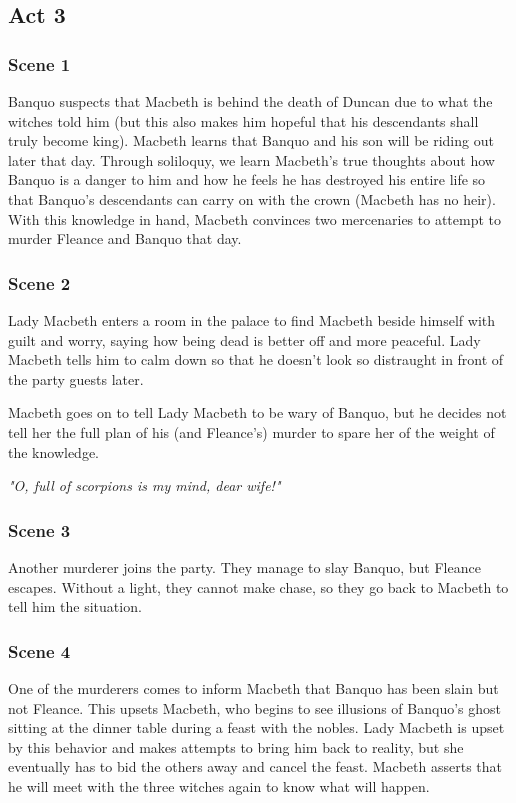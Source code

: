\subsection{Act 3}

\subsubsection{Scene 1}

Banquo suspects that Macbeth is behind the death of Duncan due to what the
witches told him (but this also makes him hopeful that his descendants shall
truly become king). Macbeth learns that Banquo and his son will be riding out
later that day. Through soliloquy, we learn Macbeth's true thoughts about how
Banquo is a danger to him and how he feels he has destroyed his entire life so
that Banquo's descendants can carry on with the crown (Macbeth has no heir).
With this knowledge in hand, Macbeth convinces two mercenaries to attempt to
murder Fleance and Banquo that day.

\subsubsection{Scene 2}

Lady Macbeth enters a room in the palace to find Macbeth beside himself with
guilt and worry, saying how being dead is better off and more peaceful. Lady Macbeth tells him to calm down so that he doesn't look so distraught in front of the party guests later.

Macbeth goes on to tell Lady Macbeth to be wary of Banquo, but he decides not
tell her the full plan of his (and Fleance's) murder to spare her of the weight
of the knowledge.

\textit{"O, full of scorpions is my mind, dear wife!"}

\subsubsection{Scene 3}

Another murderer joins the party. They manage to slay Banquo, but Fleance
escapes. Without a light, they cannot make chase, so they go back to Macbeth to
tell him the situation.

\subsubsection{Scene 4}

One of the murderers comes to inform Macbeth that Banquo has been slain but not
Fleance. This upsets Macbeth, who begins to see illusions of Banquo's ghost
sitting at the dinner table during a feast with the nobles. Lady Macbeth is
upset by this behavior and makes attempts to bring him back to reality, but she
eventually has to bid the others away and cancel the feast. Macbeth asserts
that he will meet with the three witches again to know what will happen.


